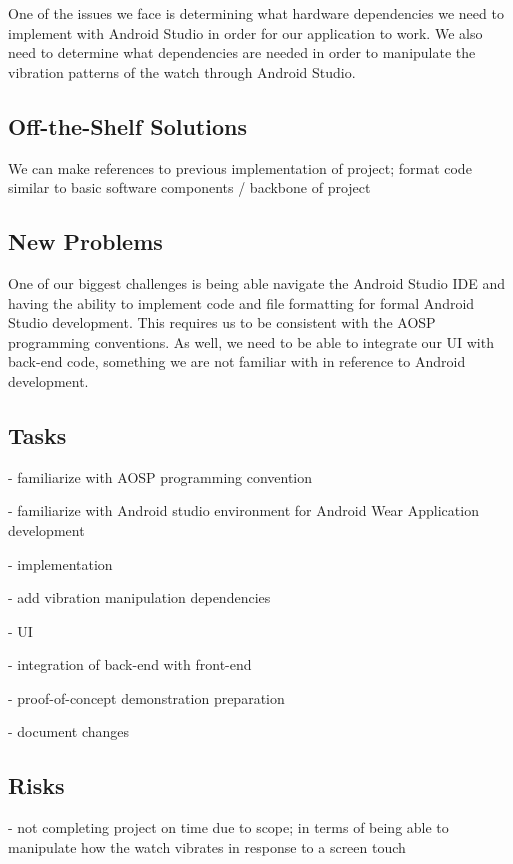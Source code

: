 \documentclass[12pt, titlepage]{article}
\begin{document}
One of the issues we face is determining what hardware dependencies we need to implement with Android Studio in order for our application to work. We also need to determine what dependencies are needed in order to manipulate the vibration patterns of the watch through Android Studio.

\subsection{Off-the-Shelf Solutions}

We can make references to previous implementation of project; format code similar to basic software components / backbone of project

\subsection{New Problems}

One of our biggest challenges is being able navigate the Android Studio IDE and having the ability to implement code and file formatting for formal Android Studio development. This requires us to be consistent with the AOSP programming conventions. As well, we need to be able to integrate our UI with back-end code, something we are not familiar with in reference to Android development.

\subsection{Tasks}

- familiarize with AOSP programming convention

\noindent - familiarize with Android studio environment for Android Wear Application development

\noindent - implementation

- add vibration manipulation dependencies

- UI

- integration of back-end with front-end

\noindent - proof-of-concept demonstration preparation

\noindent - document changes

\subsection{Risks}

- not completing project on time due to scope; in terms of being able to manipulate how the watch vibrates in response to a screen touch
\end{document}
